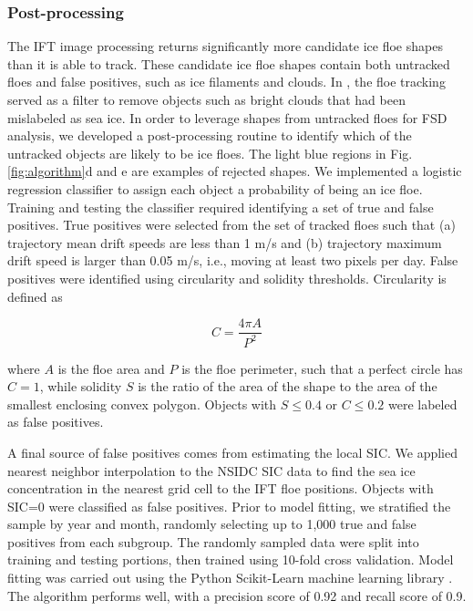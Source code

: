 \documentclass[review, jog]{igs}
\begin{document}
\subsubsection{Post-processing}
The IFT image processing returns significantly more candidate ice floe shapes than it is able to track. These candidate ice floe shapes contain both untracked floes and false positives, such as ice filaments and clouds. In \cite{lopez-acosta2019_IceFloe}, the floe tracking served as a filter to remove objects such as bright clouds that had been mislabeled as sea ice. In order to leverage shapes from untracked floes for FSD analysis, we developed a post-processing routine to identify which of the untracked objects are likely to be ice floes.
The light blue regions in Fig. \ref{fig:algorithm}d and e are examples of rejected shapes.
We implemented a logistic regression classifier to assign each object a probability of being an ice floe. Training and testing the classifier required identifying a set of true and false positives. True positives were selected from the set of tracked floes such that (a) trajectory mean drift speeds are less than 1 m/s and (b) trajectory maximum drift speed is larger than 0.05 m/s, i.e., moving at least two pixels per day. False positives were identified using circularity and solidity  thresholds. 
Circularity is defined as 
\begin{linenomath*}
\begin{equation}
    C = \frac{4\pi A}{P^2}
\end{equation} \label{eqn:circ}
\end{linenomath*}
where $A$ is the floe area and $P$ is the floe perimeter, such that a perfect circle has $C=1$, while solidity $S$ is the ratio of the area of the shape to the area of the smallest enclosing convex polygon. Objects with $S \leq 0.4$ or $C \leq 0.2$ were labeled as false positives. 

A final source of false positives comes from estimating the local SIC.
We applied nearest neighbor interpolation to the NSIDC SIC data to find the sea ice concentration in the nearest grid cell to the IFT floe positions. Objects with SIC=0 were classified as false positives.
Prior to model fitting, we stratified the sample by year and month, randomly selecting up to 1,000 true and false positives from each subgroup. The randomly sampled data were split into training and testing portions, then trained using 10-fold cross validation. Model fitting was carried out using the Python Scikit-Learn machine learning library \citep{Pedregosa2011}. The algorithm performs well, with a precision score of 0.92 and recall score of 0.9.
\end{document}
